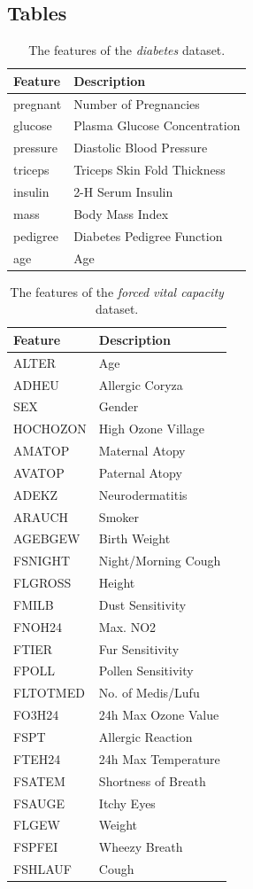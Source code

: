 \documentclass[twoside,twocolumn,10pt]{revtex4-1}
\begin{document}
	
	\subsection{Tables}
	
	\begin{table}[H]
	\center
		\begin{tabular}{l l}
		\textbf{Feature} & \textbf{Description} \\ 
		\hline
		pregnant & Number of Pregnancies\\
		glucose & Plasma Glucose Concentration\\
		pressure & Diastolic Blood Pressure\\
		triceps & Triceps Skin Fold Thickness\\
		insulin & 2-H Serum Insulin\\
		mass & Body Mass Index\\
		pedigree & Diabetes Pedigree Function\\
		age & Age
		\end{tabular}
		\caption{The features of the \textit{diabetes} dataset.\label{table_1}}
	\end{table}
	
	\begin{table}[H]
	\center
		\begin{tabular}{l l}
		\textbf{Feature} & \textbf{Description} \\ 
		\hline	
		ALTER & Age\\
		ADHEU & Allergic Coryza\\
		SEX & Gender\\
		HOCHOZON & High Ozone Village\\
		AMATOP & Maternal Atopy\\
		AVATOP & Paternal Atopy\\
		ADEKZ & Neurodermatitis\\
		ARAUCH & Smoker\\
		AGEBGEW & Birth Weight\\
		FSNIGHT & Night/Morning Cough\\
		FLGROSS & Height\\
		FMILB & Dust Sensitivity\\
		FNOH24 & Max. NO2\\
		FTIER & Fur Sensitivity\\
		FPOLL & Pollen Sensitivity\\
		FLTOTMED & No. of Medis/Lufu\\
		FO3H24 & 24h Max Ozone Value\\
		FSPT & Allergic Reaction\\
		FTEH24 & 24h Max Temperature\\
		FSATEM & Shortness of Breath\\
		FSAUGE & Itchy Eyes\\
		FLGEW & Weight\\
		FSPFEI & Wheezy Breath\\
		FSHLAUF & Cough
		\end{tabular}
		\caption{The features of the \textit{forced vital capacity} dataset.\label{table_0}}
	\end{table}
	
\end{document}
